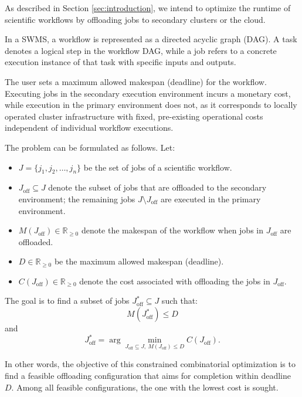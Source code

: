 As described in Section \ref{sec:introduction}, we intend to optimize the runtime of scientific workflows by offloading jobs to secondary clusters or the cloud. 

In a SWMS, a workflow is represented as a directed acyclic graph (DAG). A task denotes a logical step in the workflow DAG, while a job refers to a concrete execution instance of that task with specific inputs and outputs. 

The user sets a maximum allowed makespan (deadline) for the workflow. Executing jobs in the secondary execution environment incurs a monetary cost, while execution in the primary environment does not, as it corresponds to locally operated cluster infrastructure with fixed, pre-existing operational costs independent of individual workflow executions. 

The problem can be formulated as follows. 
\vspace{0.5em} 
Let: \begin{itemize} \item $J = \{j_1, j_2, \dots, j_n\}$ be the set of jobs of a scientific workflow. \item $J_{\text{off}} \subseteq J$ denote the subset of jobs that are offloaded to the secondary environment; the remaining jobs $J \setminus J_{\text{off}}$ are executed in the primary environment. \item $M(J_{\text{off}}) \in \mathbb{R}_{\geq 0}$ denote the makespan of the workflow when jobs in $J_{\text{off}}$ are offloaded. \item $D \in \mathbb{R}_{\geq 0}$ be the maximum allowed makespan (deadline). \item $C(J_{\text{off}}) \in \mathbb{R}_{\geq 0}$ denote the cost associated with offloading the jobs in $J_{\text{off}}$. \end{itemize} \vspace{0.7em} The goal is to find a subset of jobs $J_{\text{off}}^* \subseteq J$ such that: \[ M(J_{\text{off}}^*) \leq D \] \hspace{1em}and \[ J_{\text{off}}^* = \arg\min_{J_{\text{off}} \subseteq J,\ M(J_{\text{off}}) \leq D} C(J_{\text{off}}). \] \vspace{0.7em}

In other words, the objective of this constrained combinatorial optimization is to find a feasible offloading configuration that aims for completion within deadline $D$. Among all feasible configurations, the one with the lowest cost is sought. 

